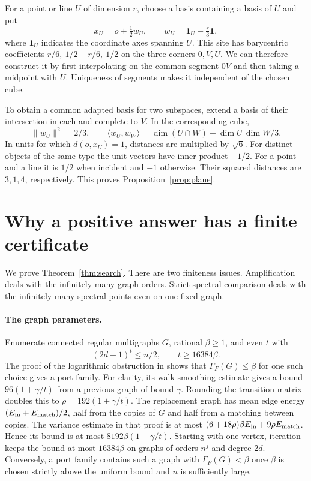 \documentclass[11pt]{article}
\theoremstyle{definition}
\newcommand{\one}{\mathbf 1}
\begin{document}
For a point or line \(U\) of dimension \(r\), choose a basis containing a
basis of \(U\) and put
\[
         x_U=o+\tfrac12 w_U,\qquad w_U=\one_U-\tfrac r3\one ,
\]
where \(\one_U\) indicates the coordinate axes spanning \(U\). This site
has barycentric coefficients \(r/6,\ 1/2-r/6,\ 1/2\) on the three
corners \(0,V,U\). We can therefore construct it by first interpolating
on the common segment \(0V\) and then taking a midpoint with \(U\).
Uniqueness of segments makes it independent of the chosen cube.

To obtain a common adapted basis for two subspaces, extend a basis of
their intersection in each and complete to \(V\). In the corresponding cube,
\[
       \|w_U\|^2=2/3,\qquad
       \langle w_U,w_W\rangle=\dim(U\cap W)-\dim U\,\dim W/3 .
\]
In units for which \(d(o,x_U)=1\), distances are multiplied by
\(\sqrt6\). For distinct objects of the same type the unit vectors have
inner product \(-1/2\). For a point and a line it is \(1/2\) when incident
and \(-1\) otherwise. Their squared distances are \(3,1,4\), respectively.
This proves Proposition~\ref{prop:plane}.

\section{Why a positive answer has a finite certificate}
\label{app:search}

We prove Theorem~\ref{thm:search}. There are two finiteness issues.
Amplification deals with the infinitely many graph orders. Strict
spectral comparison deals with the infinitely many spectral points even
on one fixed graph.

\paragraph{The graph parameters.}
Enumerate connected regular multigraphs \(G\), rational \(\beta\ge1\),
and even \(t\) with
\[
                (2d+1)^t\le n/2,\qquad t\ge16384\beta .
\]
The proof of the logarithmic obstruction in \cite{circuits} shows that
\(\Gamma_F(G)\le\beta\) for one such choice gives a port family. For
clarity, its walk-smoothing estimate gives a bound
\(96(1+\gamma/t)\) from a previous graph of bound \(\gamma\). Rounding
the transition matrix doubles this to \(\rho=192(1+\gamma/t)\).
The replacement graph has mean edge energy
\((E_{\rm in}+E_{\rm match})/2\), half from the copies of \(G\) and half
from a matching between copies. The variance estimate in that proof is
at most \((6+18\rho)\beta E_{\rm in}+9\rho E_{\rm match}\).
Hence its bound is at most \(8192\beta(1+\gamma/t)\). Starting with one
vertex, iteration keeps the bound at most \(16384\beta\) on graphs of
orders \(n^j\) and degree \(2d\). Conversely, a port family contains
such a graph with \(\Gamma_F(G)<\beta\) once \(\beta\) is chosen strictly
above the uniform bound and \(n\) is sufficiently large.
\end{document}
